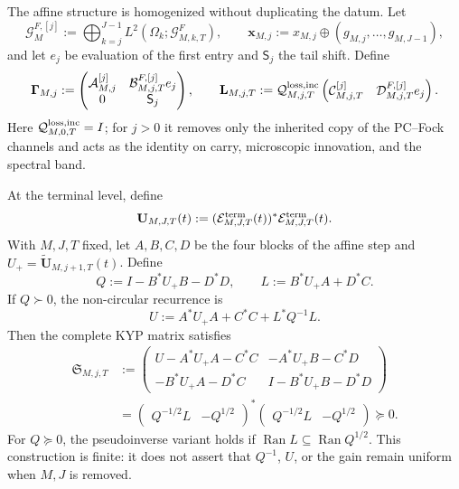 The affine structure is homogenized without duplicating the datum. Let
\[
 \mathscr G_M^{F,[j]}
 :=\bigoplus_{k=j}^{J-1}L^2(\Omega_k;\mathscr G^F_{M,k,T}),
 \qquad
 \mathbf x_{M,j}:=x_{M,j}\oplus(g_{M,j},\ldots,g_{M,J-1}),
\]
and let \(e_j\) be evaluation of the first entry and \(\mathsf S_j\) the tail shift. Define
\begin{equation}
 \mathbf\Gamma_{M,j}
 :=\begin{pmatrix}
  \mathcal A_{M,j}^{[j]}&\mathcal B_{M,j,T}^{F,[j]}e_j\\
  0&\mathsf S_j
 \end{pmatrix},
 \qquad
 \mathbf L_{M,j,T}
 :=\mathcal Q_{M,j,T}^{\rm loss,inc}
 \begin{pmatrix}
  \mathcal C_{M,j,T}^{[j]}&\mathcal D_{M,j,T}^{F,[j]}e_j
 \end{pmatrix}.
 \label{eq:ns-import-homogeneous-affine-step}
\end{equation}
Here \(\mathcal Q_{M,0,T}^{\rm loss,inc}=I\); for \(j>0\) it removes only the inherited copy of the PC--Fock channels and acts as the identity on carry, microscopic innovation, and the spectral band.

\begin{theorem}
\label{thm:ns-import-affine-stein}
At the terminal level, define
\begin{equation}
 \mathbf U_{M,J,T}(t)
 :=(\mathcal E_{M,J,T}^{\rm term}(t))^*
   \mathcal E_{M,J,T}^{\rm term}(t).
 \label{eq:ns-import-terminal-metric}
\end{equation}
With \(M,J,T\) fixed, let \(A,B,C,D\) be the four blocks of the affine step and \(U_+=\widetilde{\mathbf U}_{M,j+1,T}(t)\). Define
\begin{equation}
 Q:=I-B^*U_+B-D^*D,
 \qquad L:=B^*U_+A+D^*C.
 \label{eq:ns-import-kyp-q-l}
\end{equation}
If \(Q\succ0\), the non-circular recurrence is
\begin{equation}
 U:=A^*U_+A+C^*C+L^*Q^{-1}L.
 \label{eq:ns-import-affine-stein}
\end{equation}
Then the complete KYP matrix satisfies
\begin{equation}
 \begin{aligned}
 \mathfrak S_{M,j,T}
 &:=
 \begin{pmatrix}
 U-A^*U_+A-C^*C&-A^*U_+B-C^*D\\
 -B^*U_+A-D^*C&I-B^*U_+B-D^*D
 \end{pmatrix}\\
 &=
 \begin{pmatrix}Q^{-1/2}L&-Q^{1/2}\end{pmatrix}^{*}
 \begin{pmatrix}Q^{-1/2}L&-Q^{1/2}\end{pmatrix}
 \succeq0.
 \end{aligned}
 \label{eq:ns-import-affine-supply}
\end{equation}
For \(Q\succeq0\), the pseudoinverse variant holds if \(\operatorname{Ran}L\subseteq\operatorname{Ran}Q^{1/2}\). This construction is finite: it does not assert that \(Q^{-1}\), \(U\), or the gain remain uniform when \(M,J\) is removed.
\end{theorem}

